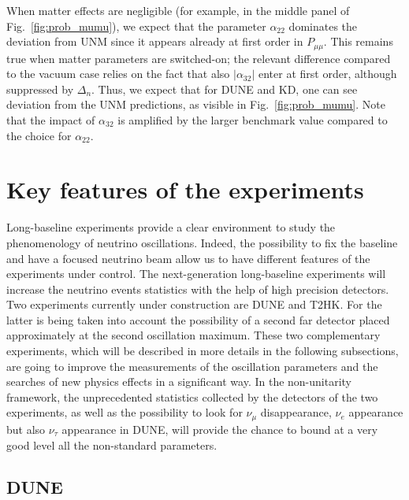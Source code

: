 \documentclass[11pt,a4paper]{article}
\newcommand{\amm}{\ensuremath{\alpha_{22}}}
\newcommand{\atm}{\ensuremath{\alpha_{32}}}
\begin{document}
When matter effects are negligible (for example, in the middle panel of Fig.~\ref{fig:prob_mumu}), we expect that the parameter $\amm$ 
dominates the deviation from UNM since it appears already at first order  in 
$P_{\mu\mu}$. This remains true when matter parameters are switched-on; the relevant difference compared to the vacuum case relies on the fact that also $|\atm|$ enter at first order, although suppressed by $\Delta_{n}$. Thus, we expect that  
for DUNE and KD, one can see deviation from the UNM predictions,  as visible in Fig.~\ref{fig:prob_mumu}. Note that the impact of $\alpha_{32}$ is amplified by the larger benchmark value compared to the choice for $\alpha_{22}$.

\section{Key features of the experiments}
\label{sec:experiments}


Long-baseline experiments provide a clear environment to study the phenomenology of neutrino oscillations. Indeed, the possibility to fix the baseline and have a focused neutrino beam allow us to have different features of the experiments under control. The next-generation long-baseline experiments will increase the neutrino events statistics with the help of high precision detectors. Two experiments currently under construction are DUNE and T2HK. For the latter is being taken into account the possibility of a second far detector placed approximately at the second oscillation maximum. These two complementary experiments, which will be described in more details in the following subsections, are going to improve the measurements of the oscillation parameters and the searches of new physics effects in a significant way. In the non-unitarity framework, the unprecedented statistics collected by the detectors of the two experiments, as well as the possibility to look for $\nu_\mu$ disappearance, $\nu_e$ appearance but also $\nu_\tau$ appearance in DUNE, will provide the chance to bound at a very good level all the non-standard parameters.



\subsection{DUNE}
\end{document}
